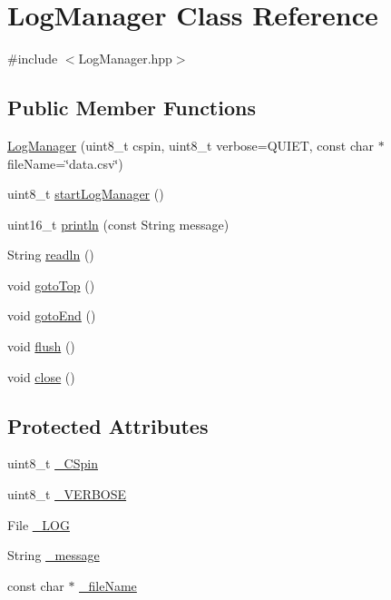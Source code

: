 \hypertarget{class_log_manager}{}\section{Log\+Manager Class Reference}
\label{class_log_manager}


{\ttfamily \#include $<$Log\+Manager.\+hpp$>$}

\subsection*{Public Member Functions}
\begin{DoxyCompactItemize}
\item 
\hyperlink{class_log_manager_a8fe43a61fed241ca3f90b6fb2a0fa48b}{Log\+Manager} (uint8\+\_\+t cspin, uint8\+\_\+t verbose=Q\+U\+I\+ET, const char $\ast$file\+Name=\char`\"{}data.\+csv\char`\"{})
\item 
uint8\+\_\+t \hyperlink{class_log_manager_a11ee4fac09a56ade231961baf91a140f}{start\+Log\+Manager} ()
\item 
uint16\+\_\+t \hyperlink{class_log_manager_a64856830c7602b4569ca2fe300e8856e}{println} (const String message)
\item 
String \hyperlink{class_log_manager_a10c05814268127bbd2ccb20bbf219485}{readln} ()
\item 
void \hyperlink{class_log_manager_ac888b10c83f7f2e898846cd2089cc5e2}{goto\+Top} ()
\item 
void \hyperlink{class_log_manager_a9850b464896d7a2fec0b03dbabbfbb93}{goto\+End} ()
\item 
void \hyperlink{class_log_manager_a7cbeb6988ba84f336b39b237e5ecad95}{flush} ()
\item 
void \hyperlink{class_log_manager_ad626761e95838c0e04968f362a1e7d3e}{close} ()
\end{DoxyCompactItemize}
\subsection*{Protected Attributes}
\begin{DoxyCompactItemize}
\item 
uint8\+\_\+t \hyperlink{class_log_manager_a82b9b5fcfd809b731f4680d83daf01a2}{\+\_\+\+C\+Spin}
\item 
uint8\+\_\+t \hyperlink{class_log_manager_aa20970098e6a6930fd54c026bef410f9}{\+\_\+\+V\+E\+R\+B\+O\+SE}
\item 
File \hyperlink{class_log_manager_ab960f79fee84861dda97a4ca0db27cf4}{\+\_\+\+L\+OG}
\item 
String \hyperlink{class_log_manager_a1e56e442c5de5bd098ac4a822797de0a}{\+\_\+message}
\item 
const char $\ast$ \hyperlink{class_log_manager_a8fd05d3a6e874fc98a8057999572017a}{\+\_\+file\+Name}
\end{DoxyCompactItemize}


